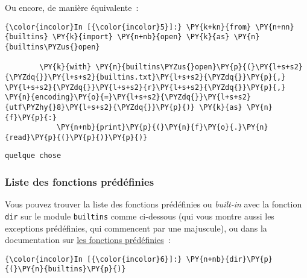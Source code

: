     Ou encore, de manière équivalente~:

    \begin{Verbatim}[commandchars=\\\{\},frame=single,framerule=0.3mm,rulecolor=\color{cellframecolor}]
{\color{incolor}In [{\color{incolor}5}]:} \PY{k+kn}{from} \PY{n+nn}{builtins} \PY{k}{import} \PY{n+nb}{open} \PY{k}{as} \PY{n}{builtins\PYZus{}open}
        
        \PY{k}{with} \PY{n}{builtins\PYZus{}open}\PY{p}{(}\PY{l+s+s2}{\PYZdq{}}\PY{l+s+s2}{builtins.txt}\PY{l+s+s2}{\PYZdq{}}\PY{p}{,} \PY{l+s+s2}{\PYZdq{}}\PY{l+s+s2}{r}\PY{l+s+s2}{\PYZdq{}}\PY{p}{,} \PY{n}{encoding}\PY{o}{=}\PY{l+s+s2}{\PYZdq{}}\PY{l+s+s2}{utf\PYZhy{}8}\PY{l+s+s2}{\PYZdq{}}\PY{p}{)} \PY{k}{as} \PY{n}{f}\PY{p}{:}
            \PY{n+nb}{print}\PY{p}{(}\PY{n}{f}\PY{o}{.}\PY{n}{read}\PY{p}{(}\PY{p}{)}\PY{p}{)}
\end{Verbatim}


    \begin{Verbatim}[commandchars=\\\{\},frame=single,framerule=0.3mm,rulecolor=\color{cellframecolor}]
quelque chose
\end{Verbatim}

    \hypertarget{liste-des-fonctions-pruxe9duxe9finies}{%
\subsubsection{Liste des fonctions
prédéfinies}\label{liste-des-fonctions-pruxe9duxe9finies}}

    Vous pouvez trouver la liste des fonctions prédéfinies ou
\emph{built-in} avec la fonction \texttt{dir} sur le module
\texttt{builtins} comme ci-dessous (qui vous montre aussi les exceptions
prédéfinies, qui commencent par une majuscule), ou dans la documentation
sur
\href{https://docs.python.org/3/library/functions.html\#built-in-funcs}{les
fonctions prédéfinies}~:

    \begin{Verbatim}[commandchars=\\\{\},frame=single,framerule=0.3mm,rulecolor=\color{cellframecolor}]
{\color{incolor}In [{\color{incolor}6}]:} \PY{n+nb}{dir}\PY{p}{(}\PY{n}{builtins}\PY{p}{)}
\end{Verbatim}


